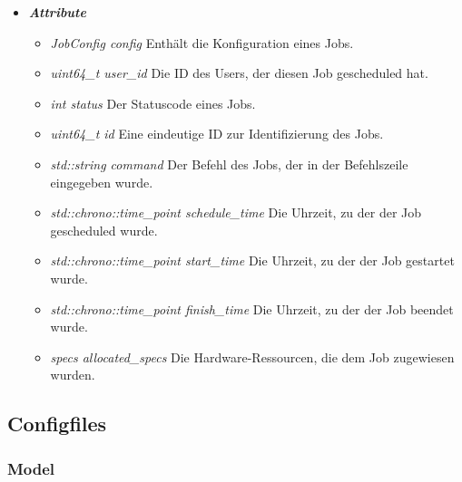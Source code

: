\documentclass[a4paper,12pt]{article}
\begin{document}
\begin{itemize}[label={}]

	\item \textit{\textbf{Attribute}}
		\begin{itemize}[label={\textbullet}]
			\item \textit{JobConfig config} Enthält die Konfiguration eines Jobs.
			
			\item \textit{uint64\_t user\_id} Die ID des Users, der diesen Job gescheduled hat.
			
			\item \textit{int status} Der Statuscode eines Jobs.
			
			\item \textit{uint64\_t id} Eine eindeutige ID zur Identifizierung des Jobs.
			
			\item \textit{std::string command} Der Befehl des Jobs, der in der Befehlszeile eingegeben wurde.
			
			\item \textit{std::chrono::time\_point schedule\_time} Die Uhrzeit, zu der der Job gescheduled wurde.
			
			\item \textit{std::chrono::time\_point start\_time} Die Uhrzeit, zu der der Job gestartet wurde.
			
			\item \textit{std::chrono::time\_point finish\_time} Die Uhrzeit, zu der der Job beendet wurde.
			
			\item \textit{specs allocated\_specs} Die Hardware-Ressourcen, die dem Job zugewiesen wurden.

		\end{itemize}


\end{itemize}
\clearpage

\subsection{Configfiles}

\subsubsection{Model}
\end{document}
